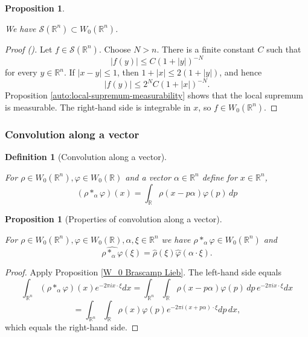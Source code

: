 \documentclass[12pt,reqno]{amsart}
\newcommand{\auto}{{({\tiny\faCar})}}
\theoremstyle{plain}
\newtheorem{proposition}[theorem]{Proposition}
\newtheorem{definition}[theorem]{Definition}
\numberwithin{equation}{section}
\theoremstyle{remark}
\newcommand{\uses}[1]{}
\newcommand{\usesdefs}[1]{}
\newcommand{\leanok}{}
\newcommand{\lean}[1]{}
\newcommand{\R}{{\mathbb R}}
\begin{document}
\begin{proposition}\label{P:schwartz-into-wiener}\uses{auto:local-supremum-measurability}\usesdefs{auto:Wiener-space-definition}
\lean{Auto.SchwartzMap.memW0}
\leanok
We have $\mathcal{S}(\R^n)\subset W_0(\R^n)$.
\end{proposition}

\begin{proof}[Proof \auto]
Let $f\in\mathcal S(\R^n)$. Choose $N>n$. There is a finite constant $C$ such that
\[
|f(y)|\le C(1+|y|)^{-N}
\]
for every $y\in\R^n$. If $|x-y|\le1$, then $1+|x|\le2(1+|y|)$, and hence
\[
|f(y)|\le 2^NC(1+|x|)^{-N}.
\]
Proposition \ref{auto:local-supremum-measurability} shows that the local supremum is measurable. The right-hand side is integrable in $x$, so $f\in W_0(\R^n)$.
\end{proof}


\subsubsection{Convolution along a vector}


\begin{definition}[Convolution along a vector]\label{auto:convolution-along-vector-definition}\uses{}\usesdefs{auto:Wiener-space-definition}
\lean{Auto.convolutionAlongVector}
For $\rho\in W_0(\R^n), \varphi\in W_0(\R)$ and a vector $\alpha\in\mathbb{R}^n$ define for $x\in\mathbb{R}^n$,
\begin{equation}\label{auto:convolution-along-vector-formula} (\rho *_\alpha \varphi)(x) = \int_{\R} \rho(x-p\alpha) \varphi(p)\,dp \end{equation}
\end{definition}

\begin{proposition}[Properties of convolution along a vector]
\label{convolution vector}\uses{W_0 Brascamp Lieb}\usesdefs{auto:Wiener-space-definition,auto:convolution-along-vector-definition}
\lean{Auto.memW0_convolutionAlongVector,Auto.fourier_convolutionAlongVector}
\leanok
For $\rho \in W_0(\R^n), \varphi\in W_0(\R), \alpha,\xi\in\mathbb{R}^n$ we have $\rho *_\alpha \varphi\in W_0(\R^n)$ and
\begin{equation}\label{auto:convolution-along-vector-Fourier-transform} \widehat{\rho *_\alpha \varphi}(\xi) = \widehat{\rho}(\xi)\widehat{\varphi}(\alpha\cdot\xi). \end{equation}
\end{proposition}

\begin{proof}
Apply Proposition \ref{W_0 Brascamp Lieb}. The left-hand side equals
\[\int_{\R^n} (\rho *_\alpha \varphi)(x)e^{-2\pi ix\cdot \xi} dx=\int_{\R^n}  \int_{\R} \rho(x-p\alpha) \varphi(p)\,dp\,e^{-2\pi ix\cdot \xi} dx\]
\[=\int_{\R^n}  \int_{\R} \rho(x) \varphi(p) e^{-2\pi i (x+p\alpha)\cdot \xi} dp\,dx,\]
which equals the right-hand side.
\end{proof}
\end{document}
